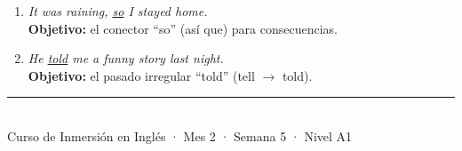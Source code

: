 \documentclass[12pt,a4paper]{article}
\begin{document}
\begin{cajamineria}
\begin{enumerate}[leftmargin=1.2cm]
  \item \textit{It was raining, \underline{so} I stayed home.}\\
    {\small\textbf{Objetivo:} el conector ``so'' (así que) para consecuencias.}

  \item \textit{He \underline{told} me a funny story last night.}\\
    {\small\textbf{Objetivo:} el pasado irregular ``told'' (tell $\rightarrow$ told).}
\end{enumerate}
\end{cajamineria}

\vfill
\begin{center}
\rule{0.5\textwidth}{0.5pt}\\[0.3cm]
{\small\color{grissuave} Curso de Inmersión en Inglés · Mes 2 · Semana 5 · Nivel A1}
\end{center}
\end{document}
